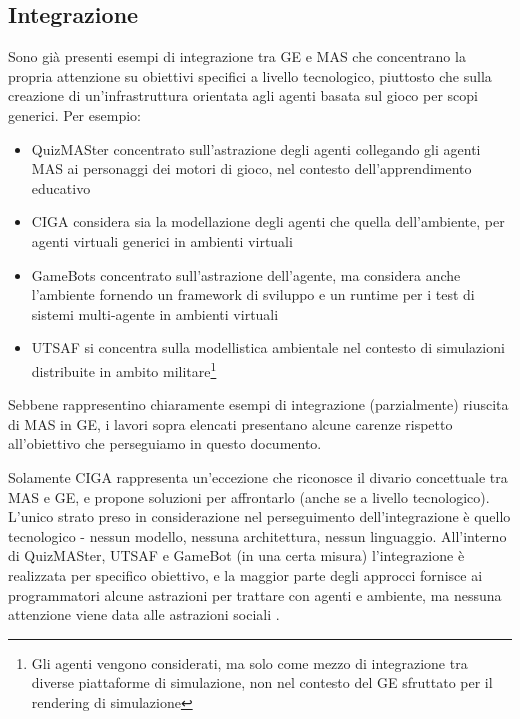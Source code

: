 \subsection{Integrazione}

Sono già presenti esempi di integrazione tra GE e MAS che concentrano la propria attenzione su obiettivi specifici a livello tecnologico, piuttosto che sulla creazione di un'infrastruttura orientata agli agenti basata sul gioco per scopi generici. Per esempio:

\begin{itemize}
    \item QuizMASter \cite{5763564} concentrato sull'astrazione degli agenti collegando gli agenti MAS ai personaggi dei motori di gioco, nel contesto dell'apprendimento educativo
    \item CIGA \cite{ciga} considera sia la modellazione degli agenti che quella dell'ambiente, per agenti virtuali generici in ambienti virtuali
    \item GameBots \cite{gamebots} concentrato sull'astrazione dell'agente, ma considera anche l'ambiente fornendo un framework di sviluppo e un runtime per i test di sistemi multi-agente in ambienti virtuali
    \item UTSAF \cite{utsaf} si concentra sulla modellistica ambientale nel contesto di simulazioni distribuite in ambito militare\footnote{Gli agenti vengono considerati, ma solo come mezzo di integrazione tra diverse piattaforme di simulazione, non nel contesto del GE sfruttato per il rendering di simulazione}
\end{itemize}

Sebbene rappresentino chiaramente esempi di integrazione (parzialmente) riuscita di MAS in GE, i lavori sopra elencati presentano alcune carenze rispetto all'obiettivo che perseguiamo in questo documento.

\smallskip

Solamente CIGA rappresenta un'eccezione che riconosce il divario concettuale tra MAS e GE, e propone soluzioni per affrontarlo (anche se a livello tecnologico). L'unico strato preso in considerazione nel perseguimento dell'integrazione è quello tecnologico - nessun modello, nessuna architettura, nessun linguaggio. All'interno di QuizMASter, UTSAF e GameBot (in una certa misura) l'integrazione è realizzata per specifico obiettivo, e la maggior parte degli approcci fornisce ai programmatori alcune astrazioni per trattare con agenti e ambiente, ma nessuna attenzione viene data alle astrazioni sociali \cite{gamemas-woa2016}.
